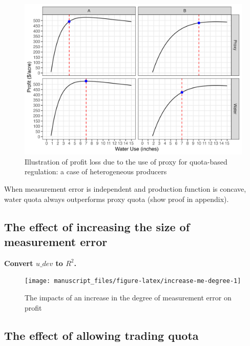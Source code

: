 \documentclass[
]{article}
\begin{document}
\begin{figure}[H]

{\centering \includegraphics{figures/g_illustration_het} 

}

\caption{Illustration of profit loss due to the use of proxy for quota-based regulation: a case of heterogeneous producers}\label{fig:illust-heterogeneous}
\end{figure}

When measurement error is independent and production function is concave, water quota always outperforms proxy quota (show proof in appendix).

\subsection{The effect of increasing the size of measurement error}\label{the-effect-of-increasing-the-size-of-measurement-error}

\textbf{Convert $u\_dev$ to $R^2$.}

\begin{figure}[H]

{\centering \texttt{[image: manuscript\_files/figure-latex/increase-me-degree-1]} 

}

\caption{The impacts of an increase in the degree of measurement error on profit}\label{fig:increase-me-degree}
\end{figure}

\subsection{The effect of allowing trading quota}\label{the-effect-of-allowing-trading-quota}
\end{document}
